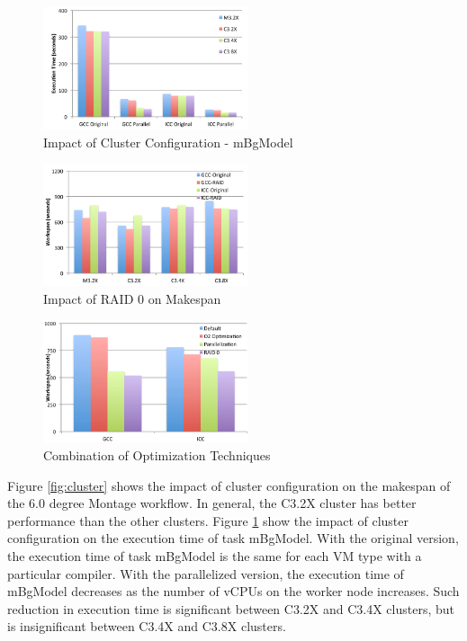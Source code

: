 \begin{figure}[t!]
\centering
\includegraphics[width=6cm]{fig04}
\caption{Impact of Cluster Configuration - mBgModel}
\label{fig:mBgModel}
\end{figure}

\begin{figure}[t!]
\centering
\includegraphics[width=6cm]{fig05}
\caption{Impact of RAID 0 on Makespan}
\label{fig:raid}
\end{figure}

\begin{figure}[t!]
\centering
\includegraphics[width=6cm]{fig06}
\caption{Combination of Optimization Techniques}
\label{fig:combine}
\end{figure}

Figure \ref{fig:cluster} shows the impact of cluster configuration on the makespan of the 6.0 degree Montage workflow. In general, the C3.2X cluster has better performance than the other clusters. Figure \ref{fig:mBgModel} show the impact of cluster configuration on the execution time of task mBgModel. With the original version, the execution time of task mBgModel is the same for each VM type with a particular compiler. With the parallelized version, the execution time of mBgModel decreases as the number of vCPUs on the worker node increases. Such reduction in execution time is significant between C3.2X and C3.4X clusters, but is insignificant between C3.4X and C3.8X clusters. 


